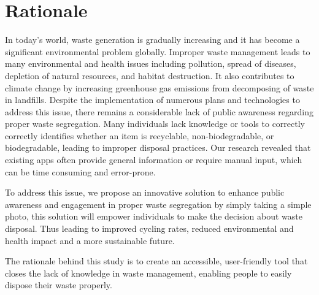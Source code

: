 \section{Rationale}

	In today’s world, waste generation is gradually increasing and it has become a significant environmental problem globally. Improper waste management leads to many environmental and health issues including pollution, spread of diseases, depletion of natural resources, and habitat destruction. It also contributes to climate change by increasing greenhouse gas emissions from decomposing of waste in landfills. Despite the implementation of numerous plans and technologies to address this issue, there remains a considerable lack of public awareness regarding proper waste segregation. Many individuals lack knowledge or tools to correctly correctly identifies whether an item is recyclable, non-biodegradable, or biodegradable, leading to improper disposal practices. Our research revealed that existing apps often provide general information or require manual input, which can be time consuming and error-prone.

	To address this issue, we propose an innovative solution to enhance public awareness and engagement in proper waste segregation by simply taking a simple photo, this solution will empower individuals to make the decision about waste disposal. Thus leading to improved cycling rates, reduced environmental and health impact and a more sustainable future.
	
	The rationale behind this study is to create an accessible, user-friendly tool that closes the lack of knowledge in waste management, enabling people to easily dispose their waste properly.